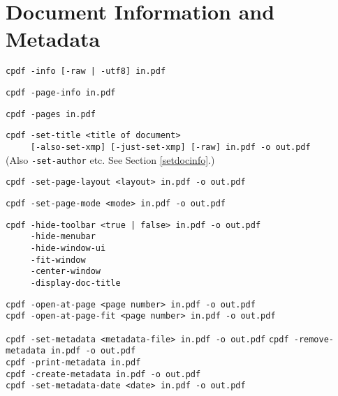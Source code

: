 \documentclass{book}
\begin{document}
\chapter{Document Information and Metadata}\label{chap:11}
  \begin{framed}

    \small\noindent\verb!cpdf -info [-raw | -utf8] in.pdf!

    \vspace{1.5mm}
    \small\noindent\verb!cpdf -page-info in.pdf!

    \vspace{1.5mm}
    \small\noindent\verb!cpdf -pages in.pdf!

    \vspace{1.5mm}
    \small\noindent\verb!cpdf -set-title <title of document>!\\
    \small\noindent\verb!     [-also-set-xmp] [-just-set-xmp] [-raw] in.pdf -o out.pdf!\\
    (Also \texttt{-set-author} etc. See Section \ref{setdocinfo}.)

    \vspace{1.5mm}
    \small\noindent\verb!cpdf -set-page-layout <layout> in.pdf -o out.pdf!

    \vspace{1.5mm}
    \small\noindent\verb!cpdf -set-page-mode <mode> in.pdf -o out.pdf!

    \vspace{1.5mm} 
    \small\noindent\verb!cpdf -hide-toolbar <true | false> in.pdf -o out.pdf!\\
    \noindent\verb!     -hide-menubar!\\
    \noindent\verb!     -hide-window-ui!\\
    \noindent\verb!     -fit-window!\\
    \noindent\verb!     -center-window!\\
    \noindent\verb!     -display-doc-title!
    
    \vspace{1.5mm}
    \small\noindent\verb!cpdf -open-at-page <page number> in.pdf -o out.pdf!\\
    \noindent\verb!cpdf -open-at-page-fit <page number> in.pdf -o out.pdf!

    \vspace{1.5mm}
    \small\noindent\verb!cpdf -set-metadata <metadata-file> in.pdf -o out.pdf!
    \small\noindent\verb!cpdf -remove-metadata in.pdf -o out.pdf!\\
    \small\noindent\verb!cpdf -print-metadata in.pdf!\\
    \small\noindent\verb!cpdf -create-metadata in.pdf -o out.pdf!\\
    \small\noindent\verb!cpdf -set-metadata-date <date> in.pdf -o out.pdf!
    

\end{framed}
\end{document}
